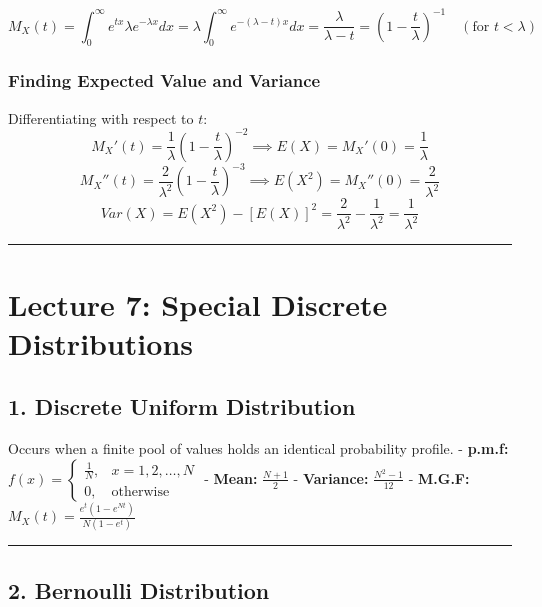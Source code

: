 \documentclass[
]{article}
\begin{document}
\[M_X(t) = \int_{0}^{\infty} e^{tx} \lambda e^{-\lambda x} dx = \lambda \int_{0}^{\infty} e^{-(\lambda - t)x} dx = \frac{\lambda}{\lambda - t} = \left(1 - \frac{t}{\lambda}\right)^{-1} \quad (\text{for } t < \lambda)\]

\subsubsection{Finding Expected Value and
Variance}\label{finding-expected-value-and-variance}

Differentiating with respect to \(t\):
\[M_X'(t) = \frac{1}{\lambda}\left(1 - \frac{t}{\lambda}\right)^{-2} \implies E(X) = M_X'(0) = \frac{1}{\lambda}\]
\[M_X''(t) = \frac{2}{\lambda^2}\left(1 - \frac{t}{\lambda}\right)^{-3} \implies E(X^2) = M_X''(0) = \frac{2}{\lambda^2}\]
\[Var(X) = E(X^2) - [E(X)]^2 = \frac{2}{\lambda^2} - \frac{1}{\lambda^2} = \frac{1}{\lambda^2}\]

\begin{center}\rule{0.5\linewidth}{0.5pt}\end{center}

\section{Lecture 7: Special Discrete
Distributions}\label{lecture-7-special-discrete-distributions}

\subsection{1. Discrete Uniform
Distribution}\label{discrete-uniform-distribution}

Occurs when a finite pool of values holds an identical probability
profile. - \textbf{p.m.f:}
\(f(x) = \begin{cases} \frac{1}{N}, & x = 1, 2, \dots, N \\ 0, & \text{otherwise} \end{cases}\)
- \textbf{Mean:} \(\frac{N + 1}{2}\) - \textbf{Variance:}
\(\frac{N^2 - 1}{12}\) - \textbf{M.G.F:}
\(M_X(t) = \frac{e^t(1 - e^{Nt})}{N(1 - e^t)}\)

\begin{center}\rule{0.5\linewidth}{0.5pt}\end{center}

\subsection{2. Bernoulli Distribution}\label{bernoulli-distribution}
\end{document}
